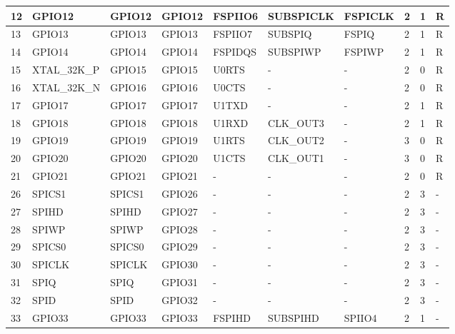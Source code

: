 \begin{longtable}[c]{|l|l|l|l|l|l|l|p{0.5cm}<{\centering}|p{0.5cm}<{\centering}|p{0.8cm}<{\centering}| }
12 & GPIO12          &  GPIO12       & GPIO12  & FSPIIO6    & SUBSPICLK    & FSPICLK     & 2 & 1 & R \\ \hline
13 & GPIO13          &  GPIO13       & GPIO13  & FSPIIO7    & SUBSPIQ      & FSPIQ       & 2 & 1 & R \\ \hline
14 & GPIO14          &  GPIO14       & GPIO14  & FSPIDQS    & SUBSPIWP     & FSPIWP      & 2 & 1 & R \\ \hline
15 & XTAL\_32K\_P    &  GPIO15       & GPIO15  & U0RTS      & -            & -           & 2 & 0 & R \\ \hline
16 & XTAL\_32K\_N    &  GPIO16       & GPIO16  & U0CTS      & -            & -           & 2 & 0 & R \\ \hline
17 & GPIO17          &  GPIO17       & GPIO17  & U1TXD      & -            & -           & 2 & 1 & R \\ \hline
18 & GPIO18          &  GPIO18       & GPIO18  & U1RXD      & CLK\_OUT3    & -           & 2 & 1 & R \\ \hline
19 & GPIO19          &  GPIO19       & GPIO19  & U1RTS      & CLK\_OUT2    & -           & 3 & 0 & R \\ \hline
20 & GPIO20          &  GPIO20       & GPIO20  & U1CTS      & CLK\_OUT1    & -           & 3 & 0 & R \\ \hline
21 & GPIO21          &  GPIO21       & GPIO21  & -          & -            & -           & 2 & 0 & R \\ \hline
26 & SPICS1          &  SPICS1       & GPIO26  & -          & -            & -           & 2 & 3 & -    \\ \hline
27 & SPIHD           &  SPIHD        & GPIO27  & -          & -            & -           & 2 & 3 & -    \\ \hline
28 & SPIWP           &  SPIWP        & GPIO28  & -          & -            & -           & 2 & 3 & -    \\ \hline
29 & SPICS0          &  SPICS0       & GPIO29  & -          & -            & -           & 2 & 3 & -    \\ \hline
30 & SPICLK          &  SPICLK       & GPIO30  & -          & -            & -           & 2 & 3 & -    \\ \hline
31 & SPIQ            &  SPIQ         & GPIO31  & -          & -            & -           & 2 & 3 & -    \\ \hline
32 & SPID            &  SPID         & GPIO32  & -          & -             & -          & 2 & 3 & -    \\ \hline
33 & GPIO33          &  GPIO33       & GPIO33  & FSPIHD     & SUBSPIHD     & SPIIO4      & 2 & 1 & -    \\ \hline

\end{longtable}
